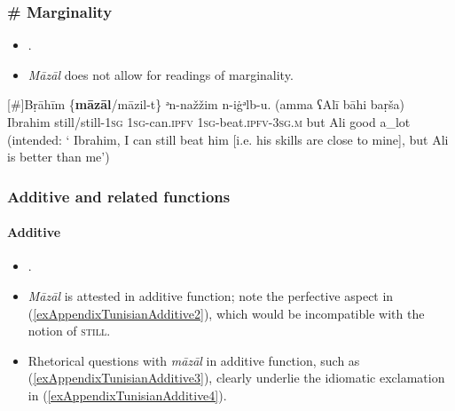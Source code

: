 \subsubsection{\# Marginality}\label{appendixTunisianMarginal}
\begin{itemize}
	\item \textcite{FischerEtAlTunisian}.
	\item \textit{Māzāl} does not allow for readings of marginality.
\end{itemize}

\begin{exe}
	\exi{}[\#]{\gll Bṛāhīm	\{\textbf{māzāl}/māzil-t\} ᵊn-nažžim n-iġᵊlb-u. 	(amma	ʕAlī bāhi	baṛša) \\
	Ibrahim still/still-1\textsc{sg} \phantom{\{}1\textsc{sg}-can.\textsc{ipfv} 1\textsc{sg}-beat.\textsc{ipfv}-3\textsc{sg}.\textsc{m} \phantom{(}but Ali good a\_lot\\
	\glt (intended: \lq{} Ibrahim, I can still beat him [i.e. his skills are close to mine], but Ali is 	better than me\rq) \parencite{FischerEtAlTunisian}}
	
\end{exe}

\subsubsection{Additive and related functions}
\paragraph{Additive}\label{appendixTunisianArabic}
\begin{itemize}
	\item \textcite{FischerEtAlTunisian}.
	\item \textit{Māzāl} is attested in additive function; note the perfective aspect in (\ref{exAppendixTunisianAdditive2}), which would be incompatible with the notion of \textsc{still}.
	\item Rhetorical questions with \textit{māzāl} in additive function, such as (\ref{exAppendixTunisianAdditive3}), clearly underlie the idiomatic exclamation in 
	 (\ref{exAppendixTunisianAdditive4}).
\end{itemize}


